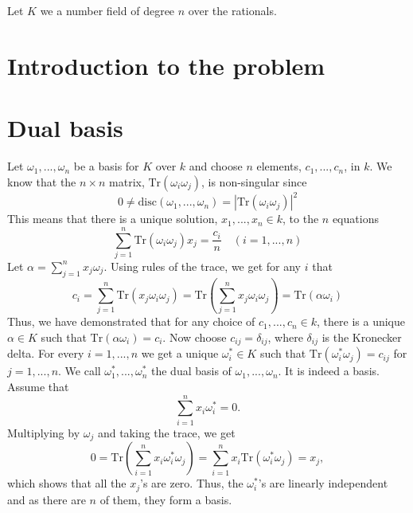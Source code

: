\documentclass{article}
\newcommand{\tr}[1]{\text{Tr}(#1)}
\begin{document}

\tableofcontents



Let $K$ we a number field of degree $n$ over the rationals.


\section{Introduction to the problem}

\section{Dual basis}
Let $\omega_1, ..., \omega_n$ be a basis for $K$ over $k$ and choose $n$ elements, $c_1, ..., c_n$, in $k$. We know that the $n \times n$ matrix, $\tr {\omega_i \omega_j}$, is non-singular since $$0 \neq \text{disc}(\omega_1, ..., \omega_n) = |\tr{\omega_i \omega_j}|^2$$
This means that there is a unique solution, $x_1, ..., x_n \in k$, to the $n$ equations
$$\sum_{j=1}^n \tr{\omega_i \omega_j} x_j = \frac{c_i}{n} \quad (i = 1, ..., n)$$
Let $\alpha = \sum_{j=1}^n x_j \omega_j$. Using rules of the trace, we get for any $i$ that
$$c_i = \sum_{j=1}^n \tr{x_j \omega_i \omega_j} = \tr{\sum_{j=1}^n x_j \omega_i \omega_j} = \tr{\alpha \omega_i}$$
Thus, we have demonstrated that for any choice of $c_1, ..., c_n \in k$, there is a unique $\alpha \in K$ such that $\tr{\alpha \omega_i} = c_i$. Now choose $c_{ij} = \delta_{ij}$, where $\delta_{ij}$ is the Kronecker delta. For every $i = 1, ..., n$ we get a unique $\omega_i^* \in K$ such that $\tr{\omega_i^* \omega_j} = c_{ij}$ for $j = 1, ..., n$. We call $\omega_1^*, ..., \omega_n^*$ the dual basis of $\omega_1, ..., \omega_n$. It is indeed a basis. Assume that 
$$\sum_{i=1}^n x_i \omega_i^* = 0.$$
Multiplying by $\omega_j$ and taking the trace, we get
$$0 = \tr{\sum_{i=1}^n x_i \omega_i^* \omega_j} = \sum_{i=1}^n x_i \tr{\omega_i^* \omega_j} = x_j,$$
which shows that all the $x_j$'s are zero. Thus, the $\omega_i^*$'s are linearly independent and as there are $n$ of them, they form a basis.
\end{document}
